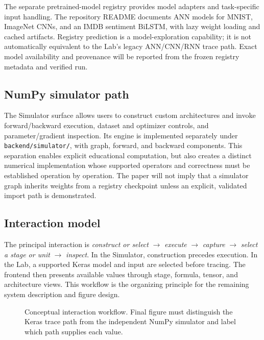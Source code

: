 \documentclass[conference]{IEEEtran}
\begin{document}
The separate pretrained-model registry provides model adapters and task-specific input handling. The repository README documents ANN models for MNIST, ImageNet CNNs, and an IMDB sentiment BiLSTM, with lazy weight loading and cached artifacts. Registry prediction is a model-exploration capability; it is not automatically equivalent to the Lab's legacy ANN/CNN/RNN trace path. Exact model availability and provenance will be reported from the frozen registry metadata and verified run.

\subsection{NumPy simulator path}
The Simulator surface allows users to construct custom architectures and invoke forward/backward execution, dataset and optimizer controls, and parameter/gradient inspection. Its engine is implemented separately under \texttt{backend/simulator/}, with graph, forward, and backward components. This separation enables explicit educational computation, but also creates a distinct numerical implementation whose supported operators and correctness must be established operation by operation. The paper will not imply that a simulator graph inherits weights from a registry checkpoint unless an explicit, validated import path is demonstrated.

\subsection{Interaction model}
The principal interaction is \emph{construct or select} $\rightarrow$ \emph{execute} $\rightarrow$ \emph{capture} $\rightarrow$ \emph{select a stage or unit} $\rightarrow$ \emph{inspect}. In the Simulator, construction precedes execution. In the Lab, a supported Keras model and input are selected before tracing. The frontend then presents available values through stage, formula, tensor, and architecture views. This workflow is the organizing principle for the remaining system description and figure design.

\begin{figure}[t]
\centering
{}
\caption{Conceptual interaction workflow. Final figure must distinguish the Keras trace path from the independent NumPy simulator and label which path supplies each value.}
\label{fig:workflow}
\end{figure}
\end{document}
